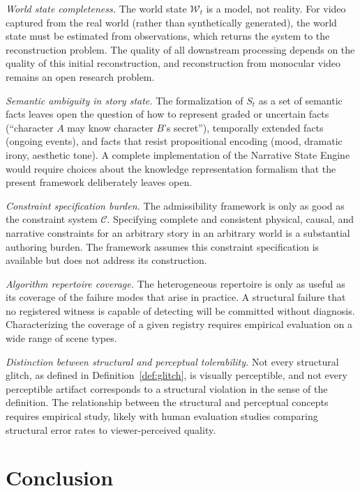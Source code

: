 \documentclass[12pt,a4paper]{article}
\theoremstyle{plain}
\theoremstyle{definition}
\theoremstyle{remark}
\begin{document}
\textit{World state completeness.} The world state $\mathcal{W}_t$ is a model, not reality. For video captured from the real world (rather than synthetically generated), the world state must be estimated from observations, which returns the system to the reconstruction problem. The quality of all downstream processing depends on the quality of this initial reconstruction, and reconstruction from monocular video remains an open research problem.

\textit{Semantic ambiguity in story state.} The formalization of $S_t$ as a set of semantic facts leaves open the question of how to represent graded or uncertain facts (``character $A$ may know character $B$'s secret''), temporally extended facts (ongoing events), and facts that resist propositional encoding (mood, dramatic irony, aesthetic tone). A complete implementation of the Narrative State Engine would require choices about the knowledge representation formalism that the present framework deliberately leaves open.

\textit{Constraint specification burden.} The admissibility framework is only as good as the constraint system $\mathcal{C}$. Specifying complete and consistent physical, causal, and narrative constraints for an arbitrary story in an arbitrary world is a substantial authoring burden. The framework assumes this constraint specification is available but does not address its construction.

\textit{Algorithm repertoire coverage.} The heterogeneous repertoire is only as useful as its coverage of the failure modes that arise in practice. A structural failure that no registered witness is capable of detecting will be committed without diagnosis. Characterizing the coverage of a given registry requires empirical evaluation on a wide range of scene types.

\textit{Distinction between structural and perceptual tolerability.} Not every structural glitch, as defined in Definition~\ref{def:glitch}, is visually perceptible, and not every perceptible artifact corresponds to a structural violation in the sense of the definition. The relationship between the structural and perceptual concepts requires empirical study, likely with human evaluation studies comparing structural error rates to viewer-perceived quality.

\section{Conclusion}
\label{sec:conclusion}
\end{document}
